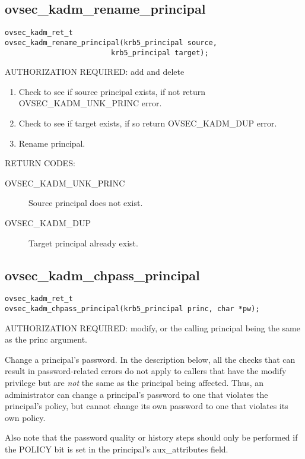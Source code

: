 \subsection{ovsec_kadm_rename_principal}

\begin{verbatim}
ovsec_kadm_ret_t
ovsec_kadm_rename_principal(krb5_principal source,
                         krb5_principal target);
\end{verbatim}

AUTHORIZATION REQUIRED: add and delete

\begin{enumerate}
\item Check to see if source principal exists, if not return
OVSEC_KADM_UNK_PRINC error. 
\item Check to see if target exists, if so return OVSEC_KADM_DUP error.
\item Rename principal.
\end{enumerate}

RETURN CODES: 

\begin{description}
\item[OVSEC_KADM_UNK_PRINC] Source principal does not exist.
\item[OVSEC_KADM_DUP] Target principal already exist.
\end{description}

\subsection{ovsec_kadm_chpass_principal}

\begin{verbatim}
ovsec_kadm_ret_t
ovsec_kadm_chpass_principal(krb5_principal princ, char *pw);
\end{verbatim}

AUTHORIZATION REQUIRED: modify, or the calling principal being the
same as the princ argument.

Change a principal's password.  In the description below, all the
checks that can result in password-related errors do not apply to
callers that have the modify privilege but are {\it not} the same as
the principal being affected.  Thus, an administrator can change a
principal's password to one that violates the principal's policy, but
cannot change its own password to one that violates its own policy.

Also note that the password quality or history steps should only be
performed if the POLICY bit is set in the principal's aux_attributes
field.

